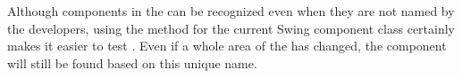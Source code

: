 
Although components in the \gdaut{} can be recognized even  when they are not named by the developers, using the  method for the current Swing component class certainly makes it easier to test \gdauts{}. Even if a whole area of the \gdaut{} has changed, the component will still be found based on this unique name. 
